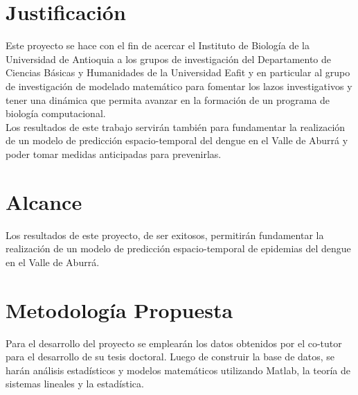 \documentclass[11pt, oneside]{article}
\theoremstyle{definition}
\theoremstyle{remark}
\begin{document}
\section{Justificación}
Este proyecto se hace con el fin de acercar el Instituto de Biología de la Universidad de Antioquia a los grupos de investigación del Departamento de Ciencias Básicas y Humanidades de la Universidad Eafit y en particular al grupo de investigación de modelado matemático para fomentar los lazos investigativos y tener una dinámica que permita avanzar en la formación de un programa de biología computacional. \\
Los resultados de este trabajo servirán también para fundamentar la realización de un modelo de predicción espacio-temporal del dengue en el Valle de Aburrá y poder tomar medidas anticipadas para prevenirlas.

\section{Alcance}
Los resultados de este proyecto, de ser exitosos, permitirán fundamentar la realización de un modelo de predicción  espacio-temporal de epidemias del dengue en el Valle de Aburrá.

\section{Metodología Propuesta}
Para el desarrollo del proyecto se emplearán los datos obtenidos por el co-tutor para el desarrollo de su tesis doctoral. Luego de construir la base de datos, se harán análisis estadísticos y modelos matemáticos utilizando Matlab, la teoría de sistemas lineales y la estadística.
\end{document}
